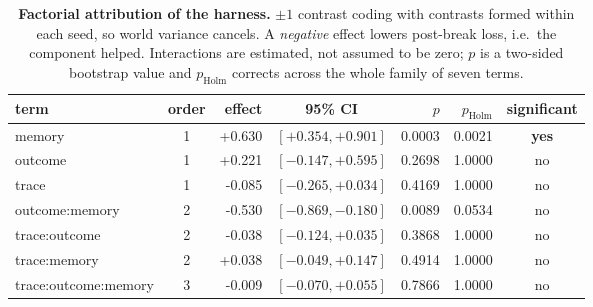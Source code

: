\begin{table}[t]\centering\small
\caption{\textbf{Factorial attribution of the harness.} $\pm1$ contrast coding with contrasts
formed within each seed, so world variance cancels. A \emph{negative} effect lowers post-break
loss, i.e.\ the component helped. Interactions are estimated, not assumed to be zero; $p$ is a
two-sided bootstrap value and $p_{\text{Holm}}$ corrects across the whole family of seven
terms.}
\label{tab:factorial}
\begin{tabular}{@{}l c r c r r c@{}}
\toprule
term & order & effect & 95\% CI & $p$ & $p_{\text{Holm}}$ & significant \\
\midrule
memory & 1 & +0.630 & $[+0.354, +0.901]$ & 0.0003 & 0.0021 & \textbf{yes} \\
outcome & 1 & +0.221 & $[-0.147, +0.595]$ & 0.2698 & 1.0000 & no \\
trace & 1 & -0.085 & $[-0.265, +0.034]$ & 0.4169 & 1.0000 & no \\
outcome:memory & 2 & -0.530 & $[-0.869, -0.180]$ & 0.0089 & 0.0534 & no \\
trace:outcome & 2 & -0.038 & $[-0.124, +0.035]$ & 0.3868 & 1.0000 & no \\
trace:memory & 2 & +0.038 & $[-0.049, +0.147]$ & 0.4914 & 1.0000 & no \\
trace:outcome:memory & 3 & -0.009 & $[-0.070, +0.055]$ & 0.7866 & 1.0000 & no \\
\bottomrule
\end{tabular}
\end{table}
